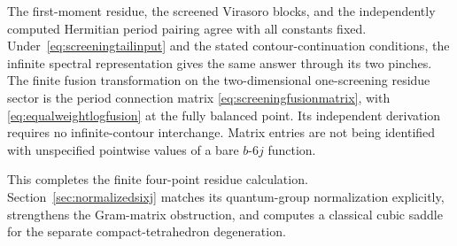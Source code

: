 The first-moment residue, the screened Virasoro blocks, and the
independently computed Hermitian period pairing agree with all
constants fixed. Under~\eqref{eq:screeningtailinput} and the stated
contour-continuation conditions, the infinite spectral representation
gives the same answer through its two pinches. The finite fusion
transformation on the two-dimensional one-screening residue sector
is the period connection matrix
\eqref{eq:screeningfusionmatrix}, with
\eqref{eq:equalweightlogfusion} at the fully balanced point.
Its independent derivation requires no infinite-contour interchange.
Matrix entries are not
being identified with unspecified pointwise values of a
bare $b$-$6j$ function.

This completes the finite four-point residue calculation.
Section~\ref{sec:normalizedsixj} matches its quantum-group
normalization explicitly, strengthens the Gram-matrix
obstruction, and computes a classical cubic saddle for the
separate compact-tetrahedron degeneration.


